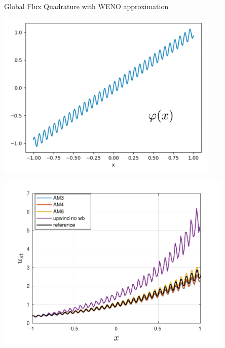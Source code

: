 \begin{frame}[t]{Global Flux Quadrature  with WENO approximation}
{\begin{minipage}{0.5\textwidth}
\centering\includegraphics[width=0.8\textwidth]{figs/WENO-FD/figures/Burgers/perturbations/oscillation} 
\end{minipage}\hfill
\begin{minipage}{0.5\textwidth}
\centering\includegraphics[width=0.85\textwidth]{figs/WENO-FD/figures/Burgers/perturbations/weno3_AM_stationary_n150} 
\end{minipage}
} 


\end{frame}
